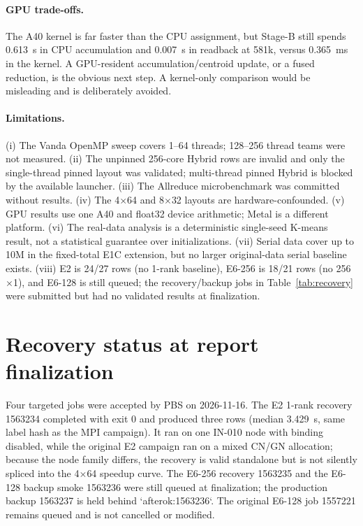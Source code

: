 \documentclass[10pt,a4paper]{article}
\begin{document}
\paragraph{GPU trade-offs.}
The A40 kernel is far faster than the CPU assignment, but Stage-B still spends
0.613~s in CPU accumulation and 0.007~s in readback at 581k, versus 0.365~ms
in the kernel. A GPU-resident accumulation/centroid update, or a fused
reduction, is the obvious next step. A kernel-only comparison would be
misleading and is deliberately avoided.

\paragraph{Limitations.}
(i) The Vanda OpenMP sweep covers 1--64 threads; 128--256 thread teams were not
measured. (ii) The unpinned 256-core Hybrid rows are invalid and only the
single-thread pinned layout was validated; multi-thread pinned Hybrid is
blocked by the available launcher. (iii) The Allreduce microbenchmark was
committed without results. (iv) The 4$\times$64 and 8$\times$32 layouts are
hardware-confounded. (v) GPU results use one A40 and float32 device arithmetic;
Metal is a different platform. (vi) The real-data analysis is a deterministic
single-seed K-means result, not a statistical guarantee over initializations.
(vii) Serial data cover up to 10M in the fixed-total E1C extension, but no
larger original-data serial baseline exists. (viii) E2 is 24/27 rows (no 1-rank
baseline), E6-256 is 18/21 rows (no 256$\times$1), and E6-128 is still queued;
the recovery/backup jobs in Table~\ref{tab:recovery} were submitted but had no
validated results at finalization.

\section{Recovery status at report finalization}
Four targeted jobs were accepted by PBS on 2026-11-16. The E2 1-rank recovery
1563234 completed with exit 0 and produced three rows (median 3.429~s, same
label hash as the MPI campaign). It ran on one IN-010 node with binding
disabled, while the original E2 campaign ran on a mixed CN/GN allocation;
because the node family differs, the recovery is valid standalone but is not
silently spliced into the 4$\times$64 speedup curve. The E6-256 recovery
1563235 and the E6-128 backup smoke 1563236 were still queued at finalization;
the production backup 1563237 is held behind `afterok:1563236`. The original
E6-128 job 1557221 remains queued and is not cancelled or modified.
\end{document}
